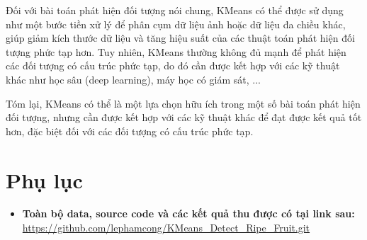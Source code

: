 \documentclass[a4paper]{article}
\begin{document}
Đối với bài toán phát hiện đối tượng nói chung, KMeans có thể được sử dụng như
một bước tiền xử lý để phân cụm dữ liệu ảnh hoặc dữ liệu đa chiều khác, giúp giảm
kích thước dữ liệu và tăng hiệu suất của các thuật toán phát hiện đối tượng phức tạp
hơn. Tuy nhiên, KMeans thường không đủ mạnh để phát hiện các đối tượng có cấu
trúc phức tạp, do đó cần được kết hợp với các kỹ thuật khác như học sâu (deep
learning), máy học có giám sát, ...

Tóm lại, KMeans có thể là một lựa chọn hữu ích trong một số bài toán phát hiện
đối tượng, nhưng cần được kết hợp với các kỹ thuật khác để đạt được kết quả tốt hơn,
đặc biệt đối với các đối tượng có cấu trúc phức tạp.

\section{Phụ lục}
\begin{itemize}[label={}]
    \item \textbf{Toàn bộ data, source code và các kết quả thu được có tại link sau:} \url{https://github.com/lephamcong/KMeans_Detect_Ripe_Fruit.git}
\end{itemize}
\newpage
\renewcommand*{\bibfont}{\small}
\printbibliography
\end{document}

